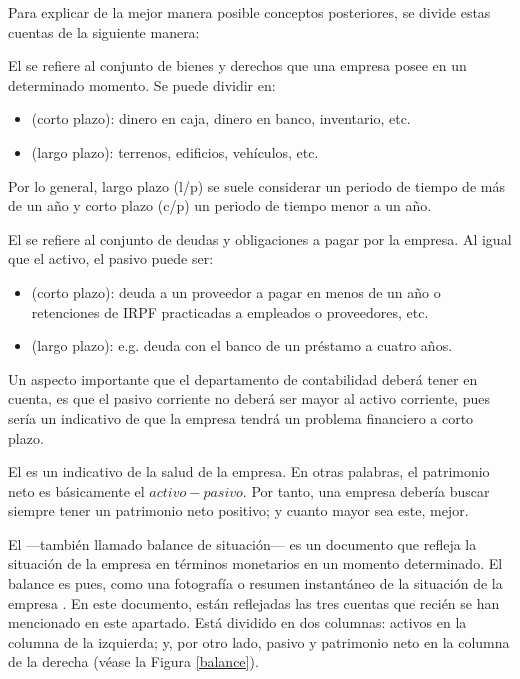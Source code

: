 Para explicar de la mejor manera posible conceptos posteriores, se divide estas cuentas de la siguiente manera:
\


El  se refiere al conjunto de bienes y derechos que una empresa posee en un determinado momento.
Se puede dividir en:
\begin{itemize}
	\item {} (corto plazo): dinero en caja, dinero en banco, inventario, etc.
    \item \B{No corriente} (largo plazo): terrenos, edificios, vehículos, etc.
\end{itemize}
Por lo general, largo plazo (l/p) se suele considerar un periodo de tiempo de más de un año y corto plazo (c/p) un periodo de tiempo menor a un año.

\bigskip


El  se refiere al conjunto de deudas y obligaciones a pagar por la empresa. Al igual que el activo, el pasivo puede ser:
\begin{itemize}
	\item {} (corto plazo): deuda a un proveedor a pagar en menos de un año o retenciones de IRPF practicadas a empleados o proveedores, etc.
    \item \B{No corriente} (largo plazo): e.g. deuda con el banco de un préstamo a cuatro años.
\end{itemize}

Un aspecto importante que el departamento de contabilidad deberá tener en cuenta, es que el pasivo corriente no deberá ser mayor al activo corriente, pues sería un indicativo de que la empresa tendrá un problema financiero a corto plazo.

\bigskip


El  es un indicativo de la salud de la empresa. En otras palabras, el patrimonio neto es básicamente el $activo  - pasivo$. Por tanto, una empresa debería buscar siempre tener un patrimonio neto positivo; y cuanto mayor sea este, mejor.

\bigskip


El  ---también llamado balance de situación--- es un documento que refleja la situación de la empresa en términos monetarios en un momento determinado. El balance es pues, como una fotografía o resumen instantáneo de la situación de la empresa \parencite{libroContabilidad}. En este documento, están reflejadas las tres cuentas que recién se han mencionado en este apartado. Está dividido en dos columnas: activos en la columna de la izquierda; y, por otro lado, pasivo y patrimonio neto en la columna de la derecha (véase la Figura \ref{balance}).


